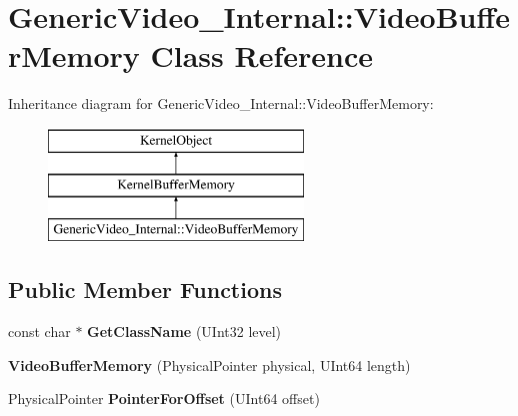 \hypertarget{class_generic_video___internal_1_1_video_buffer_memory}{}\section{Generic\+Video\+\_\+\+Internal\+:\+:Video\+Buffer\+Memory Class Reference}
\label{class_generic_video___internal_1_1_video_buffer_memory}
Inheritance diagram for Generic\+Video\+\_\+\+Internal\+:\+:Video\+Buffer\+Memory\+:\begin{figure}[H]
\begin{center}
\leavevmode
\includegraphics[height=3.000000cm]{class_generic_video___internal_1_1_video_buffer_memory}
\end{center}
\end{figure}
\subsection*{Public Member Functions}
\begin{DoxyCompactItemize}
\item 
\mbox{\label{class_generic_video___internal_1_1_video_buffer_memory_a059be07bd33cc361d22301e1f99a2395}} 
const char $\ast$ {\bfseries Get\+Class\+Name} (U\+Int32 level)
\item 
\mbox{\label{class_generic_video___internal_1_1_video_buffer_memory_a64efcb73e2e14417d94305651554c8b4}} 
{\bfseries Video\+Buffer\+Memory} (Physical\+Pointer physical, U\+Int64 length)
\item 
\mbox{\label{class_generic_video___internal_1_1_video_buffer_memory_affac14b1ec8640f5d123969a6a8faf4c}} 
Physical\+Pointer {\bfseries Pointer\+For\+Offset} (U\+Int64 offset)
\end{DoxyCompactItemize}

